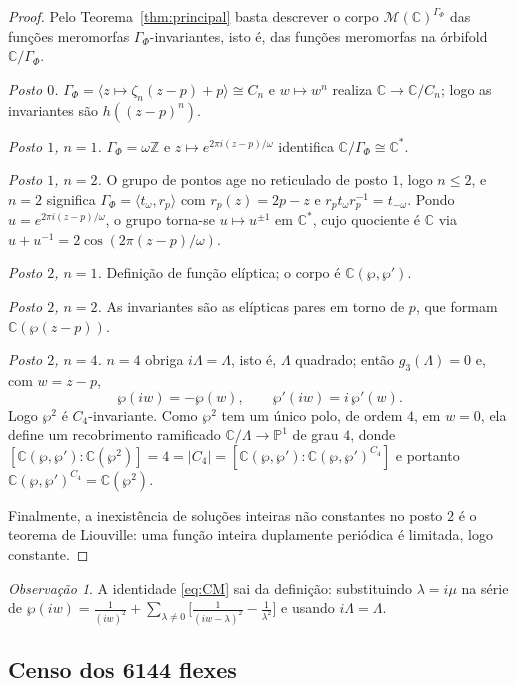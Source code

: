 \documentclass[11pt,a4paper]{article}
\theoremstyle{plain}
\theoremstyle{definition}
\theoremstyle{remark}
\newtheorem{observacao}[teorema]{Observação}
\newcommand{\C}{\mathbb{C}}
\newcommand{\Z}{\mathbb{Z}}
\begin{document}
\begin{proof}
Pelo Teorema~\ref{thm:principal} basta descrever o corpo
$\mathscr{M}(\C)^{\Gamma_\Phi}$ das funções meromorfas $\Gamma_\Phi$-invariantes,
isto é, das funções meromorfas na órbifold $\C/\Gamma_\Phi$.

\emph{Posto $0$.} $\Gamma_\Phi=\langle z\mapsto \zeta_n(z-p)+p\rangle\cong C_n$ e
$w\mapsto w^n$ realiza $\C\to\C/C_n$; logo as invariantes são $h((z-p)^n)$.

\emph{Posto $1$, $n=1$.} $\Gamma_\Phi=\omega\Z$ e $z\mapsto e^{2\pi i(z-p)/\omega}$
identifica $\C/\Gamma_\Phi\cong\C^\ast$.

\emph{Posto $1$, $n=2$.} O grupo de pontos age no reticulado de posto $1$, logo
$n\le 2$, e $n=2$ significa $\Gamma_\Phi=\langle t_\omega, r_p\rangle$ com
$r_p(z)=2p-z$ e $r_pt_\omega r_p^{-1}=t_{-\omega}$. Pondo
$u=e^{2\pi i (z-p)/\omega}$, o grupo torna-se $u\mapsto u^{\pm1}$ em $\C^\ast$,
cujo quociente é $\C$ via $u+u^{-1}=2\cos(2\pi(z-p)/\omega)$.

\emph{Posto $2$, $n=1$.} Definição de função elíptica; o corpo é $\C(\wp,\wp')$.

\emph{Posto $2$, $n=2$.} As invariantes são as elípticas pares em torno de $p$,
que formam $\C(\wp(z-p))$.

\emph{Posto $2$, $n=4$.} $n=4$ obriga $i\Lambda=\Lambda$, isto é, $\Lambda$
quadrado; então $g_3(\Lambda)=0$ e, com $w=z-p$,
\begin{equation}\label{eq:CM}
\wp(iw)=-\wp(w),\qquad \wp'(iw)=i\,\wp'(w).
\end{equation}
Logo $\wp^2$ é $C_4$-invariante. Como $\wp^2$ tem um único polo, de ordem $4$,
em $w=0$, ela define um recobrimento ramificado
$\C/\Lambda\to\mathbb{P}^1$ de grau $4$, donde
$[\C(\wp,\wp'):\C(\wp^2)]=4=|C_4|=[\C(\wp,\wp'):\C(\wp,\wp')^{C_4}]$
e portanto $\C(\wp,\wp')^{C_4}=\C(\wp^2)$.

Finalmente, a inexistência de soluções inteiras não constantes no posto $2$ é o
teorema de Liouville: uma função inteira duplamente periódica é limitada, logo
constante.
\end{proof}

\begin{observacao}
A identidade \eqref{eq:CM} sai da definição: substituindo $\lambda=i\mu$ na
série de $\wp(iw)=\frac1{(iw)^2}+\sum_{\lambda\ne0}
\bigl[\frac1{(iw-\lambda)^2}-\frac1{\lambda^2}\bigr]$ e usando
$i\Lambda=\Lambda$.
\end{observacao}

\subsection*{Censo dos 6144 flexes}
\end{document}
